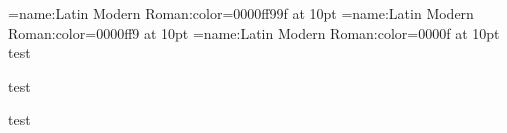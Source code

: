 
\font\testa={name:Latin Modern Roman:color=0000ff99f} at 10pt
\font\testb={name:Latin Modern Roman:color=0000ff9}   at 10pt
\font\testc={name:Latin Modern Roman:color=0000f}     at 10pt
\testa test\par
\testb test\par
\testc test\par
\bye
